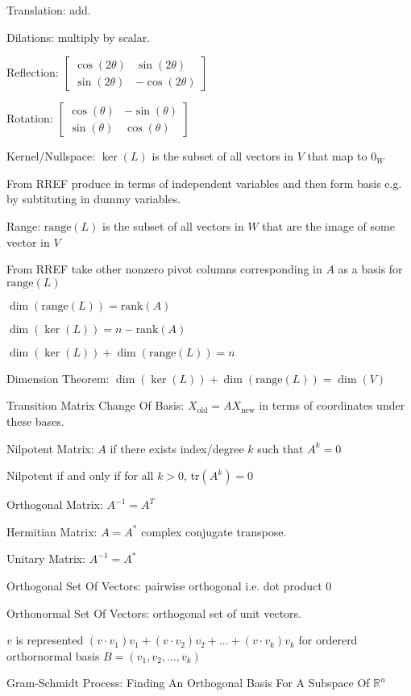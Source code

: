 Translation: add.

Dilations: multiply by scalar.

Reflection: $\begin{bmatrix} \cos (2 \theta) & \sin (2 \theta) \\ \sin (2 \theta) & -\cos (2 \theta) \end{bmatrix}$

Rotation: $\begin{bmatrix} \cos (\theta) & -\sin (\theta) \\ \sin (\theta) & \cos (\theta) \end{bmatrix}$

Kernel/Nullspace: $\ker (L)$ is the subset of all vectors in $V$ that map to $0_W$

From RREF produce in terms of independent variables and then form basis e.g. by subtituting in dummy variables.

Range: $\text{range} (L)$ is the subset of all vectors in $W$ that are the image of some vector in $V$

From RREF take other nonzero pivot columns corresponding in $A$ as a basis for $\text{range} (L)$

$\dim (\text{range} (L))=\text{rank} (A)$

$\dim (\ker (L)) = n-\text{rank} (A)$

$\dim (\ker (L))+\dim (\text{range} (L)) = n$

Dimension Theorem: $\dim (\ker (L))+\dim (\text{range} (L)) = \dim (V)$

Transition Matrix Change Of Basis: $X_{\text{old}}=AX_{\text{new}}$ in terms of coordinates under these bases.

Nilpotent Matrix: $A$ if there exists index/degree $k$ such that $A^k=0$

Nilpotent if and only if for all $k>0$, $\text{tr}(A^k)=0$

Orthogonal Matrix: $A^{-1}=A^T$

Hermitian Matrix: $A=A^*$ complex conjugate transpose.

Unitary Matrix: $A^{-1}=A^*$

Orthogonal Set Of Vectors: pairwise orthogonal i.e. dot product $0$

Orthonormal Set Of Vectors: orthogonal set of unit vectors.

$v$ is represented $(v \cdot v_1) v_1 + (v \cdot v_2) v_2 + \dots + (v \cdot v_k) v_k$ for ordererd orthornormal basis $B=(v_1,v_2,\dots,v_k)$

Gram-Schmidt Process: Finding An Orthogonal Basis For A Subspace Of $\mathbb{R}^n$

